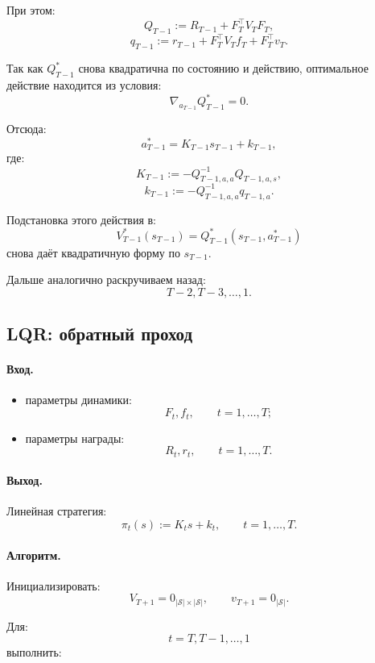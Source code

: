 \documentclass[12pt,a4paper]{article}
\begin{document}
При этом:
\[
Q_{T-1}
:=
R_{T-1}
+
F_T^\top V_TF_T,
\]
\[
q_{T-1}
:=
r_{T-1}
+
F_T^\top V_Tf_T
+
F_T^\top v_T.
\]

Так как $Q_{T-1}^\ast$ снова квадратична по состоянию и действию, оптимальное действие находится из условия:
\[
\nabla_{a_{T-1}}Q_{T-1}^\ast=0.
\]

Отсюда:
\[
a_{T-1}^\ast
=
K_{T-1}s_{T-1}
+
k_{T-1},
\]
где:
\[
K_{T-1}
:=
-
Q_{T-1,a,a}^{-1}
Q_{T-1,a,s},
\]
\[
k_{T-1}
:=
-
Q_{T-1,a,a}^{-1}
q_{T-1,a}.
\]

Подстановка этого действия в:
\[
V_{T-1}^\ast(s_{T-1})
=
Q_{T-1}^\ast(s_{T-1},a_{T-1}^\ast)
\]
снова даёт квадратичную форму по $s_{T-1}$.

Дальше аналогично раскручиваем назад:
\[
T-2,T-3,\ldots,1.
\]

\subsection{LQR: обратный проход}

\paragraph{Вход.}

\begin{itemize}
    \item параметры динамики:
    \[
    F_t,f_t,
    \qquad
    t=1,\ldots,T;
    \]

    \item параметры награды:
    \[
    R_t,r_t,
    \qquad
    t=1,\ldots,T.
    \]
\end{itemize}

\paragraph{Выход.}

Линейная стратегия:
\[
\pi_t(s)
:=
K_ts+k_t,
\qquad
t=1,\ldots,T.
\]

\paragraph{Алгоритм.}

Инициализировать:
\[
V_{T+1}=0_{|\mathcal S|\times|\mathcal S|},
\qquad
v_{T+1}=0_{|\mathcal S|}.
\]

Для:
\[
t=T,T-1,\ldots,1
\]
выполнить:
\end{document}

